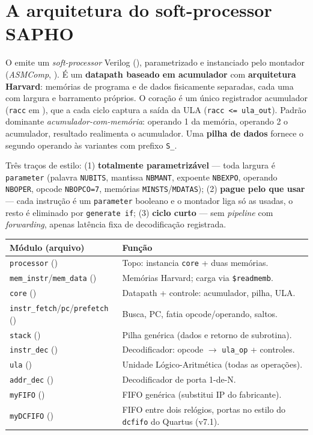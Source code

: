 \section{A arquitetura do soft-processor SAPHO}
\label{sec:S02-soft-processor}

O  emite um \emph{soft-processor} Verilog (), parametrizado e instanciado pelo montador (\emph{ASMComp}, ). É um \textbf{datapath baseado em acumulador} com \textbf{arquitetura Harvard}: memórias de programa e de dados fisicamente separadas, cada uma com largura e barramento próprios. O coração é um único registrador acumulador (\lstinline|racc| em ), que a cada ciclo captura a saída da ULA (\lstinline|racc <= ula_out|). Padrão dominante \emph{acumulador-com-memória}: operando 1 da memória, operando 2 o acumulador, resultado realimenta o acumulador. Uma \textbf{pilha de dados} fornece o segundo operando às variantes com prefixo \lstinline|S_|.

Três traços de estilo: (1) \textbf{totalmente parametrizável} --- toda largura é \lstinline|parameter| (palavra \lstinline|NUBITS|, mantissa \lstinline|NBMANT|, expoente \lstinline|NBEXPO|, operando \lstinline|NBOPER|, opcode \lstinline|NBOPCO=7|, memórias \lstinline|MINSTS|/\lstinline|MDATAS|); (2) \textbf{pague pelo que usar} --- cada instrução é um \lstinline|parameter| booleano e o montador liga só as usadas, o resto é eliminado por \lstinline|generate if|; (3) \textbf{ciclo curto} --- sem \emph{pipeline} com \emph{forwarding}, apenas latência fixa de decodificação registrada.

\begin{longtable}{l l}
\toprule \textbf{Módulo (arquivo)} & \textbf{Função} \\ \midrule \endhead
\lstinline|processor| () & Topo: instancia \lstinline|core| + duas memórias. \\
\lstinline|mem_instr|/\lstinline|mem_data| () & Memórias Harvard; carga via \lstinline|$readmemb|. \\
\lstinline|core| () & Datapath + controle: acumulador, pilha, ULA. \\
\lstinline|instr_fetch|/\lstinline|pc|/\lstinline|prefetch| () & Busca, PC, fatia opcode/operando, saltos. \\
\lstinline|stack| () & Pilha genérica (dados e retorno de subrotina). \\
\lstinline|instr_dec| () & Decodificador: opcode $\rightarrow$ \lstinline|ula_op| + controles. \\
\lstinline|ula| () & Unidade Lógico-Aritmética (todas as operações). \\
\lstinline|addr_dec| () & Decodificador de porta 1-de-N. \\
\lstinline|myFIFO| () & FIFO genérica (substitui IP do fabricante). \\
\lstinline|myDCFIFO| () & FIFO entre dois relógios, portas no estilo do \lstinline|dcfifo| do Quartus (v7.1). \\
\bottomrule
\end{longtable}

